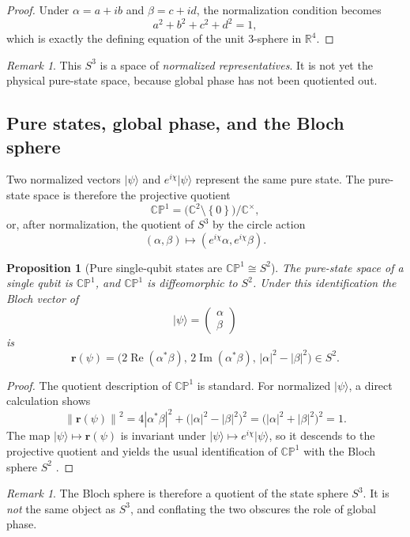 \documentclass[11pt]{article}
\newtheorem{proposition}[definition]{Proposition}
\theoremstyle{remark}
\newtheorem{remark}[definition]{Remark}
\newcommand{\R}{\mathbb{R}}
\newcommand{\C}{\mathbb{C}}
\newcommand{\CP}{\mathbb{CP}}
\newcommand{\norm}[1]{\left\lVert #1 \right\rVert}
\newcommand{\abs}[1]{\left\lvert #1 \right\rvert}
\newcommand{\set}[1]{\left\{ #1 \right\}}
\newcommand{\ket}[1]{\lvert #1 \rangle}
\newcommand{\bloch}[1]{\bm{#1}}
\begin{document}
\begin{proof}
Under $\alpha=a+ib$ and $\beta=c+id$, the normalization condition becomes
\[
a^2+b^2+c^2+d^2=1,
\]
which is exactly the defining equation of the unit $3$-sphere in $\R^4$.
\end{proof}

\begin{remark}
This $S^3$ is a space of \emph{normalized representatives}. It is not yet the physical pure-state space, because global phase has not been quotiented out.
\end{remark}

\subsection{Pure states, global phase, and the Bloch sphere}

Two normalized vectors $\ket{\psi}$ and $e^{i\chi}\ket{\psi}$ represent the same pure state. The pure-state space is therefore the projective quotient
\[
\CP^1 = \big(\C^2\setminus\set{0}\big)/\C^\times,
\]
or, after normalization, the quotient of $S^3$ by the circle action
\[
(\alpha,\beta)\mapsto(e^{i\chi}\alpha,e^{i\chi}\beta).
\]

\begin{proposition}[Pure single-qubit states are $\CP^1\cong S^2$]
The pure-state space of a single qubit is $\CP^1$, and $\CP^1$ is diffeomorphic to $S^2$. Under this identification the Bloch vector of
\[
\ket{\psi}=\begin{pmatrix}\alpha \\ \beta\end{pmatrix}
\]
is
\[
\bloch{r}(\psi)=
\bigl(2\operatorname{Re}(\alpha^\ast\beta),\,
2\operatorname{Im}(\alpha^\ast\beta),\,
\abs{\alpha}^2-\abs{\beta}^2\bigr)\in S^2.
\]
\end{proposition}

\begin{proof}
The quotient description of $\CP^1$ is standard. For normalized $\ket{\psi}$, a direct calculation shows
\[
\norm{\bloch{r}(\psi)}^2
=4\abs{\alpha^\ast\beta}^2+\bigl(\abs{\alpha}^2-\abs{\beta}^2\bigr)^2
=\bigl(\abs{\alpha}^2+\abs{\beta}^2\bigr)^2=1.
\]
The map $\ket{\psi}\mapsto\bloch{r}(\psi)$ is invariant under $\ket{\psi}\mapsto e^{i\chi}\ket{\psi}$, so it descends to the projective quotient and yields the usual identification of $\CP^1$ with the Bloch sphere $S^2$ \citep{bloch1946,nielsen2010}.
\end{proof}

\begin{remark}
The Bloch sphere is therefore a quotient of the state sphere $S^3$. It is \emph{not} the same object as $S^3$, and conflating the two obscures the role of global phase.
\end{remark}
\end{document}
